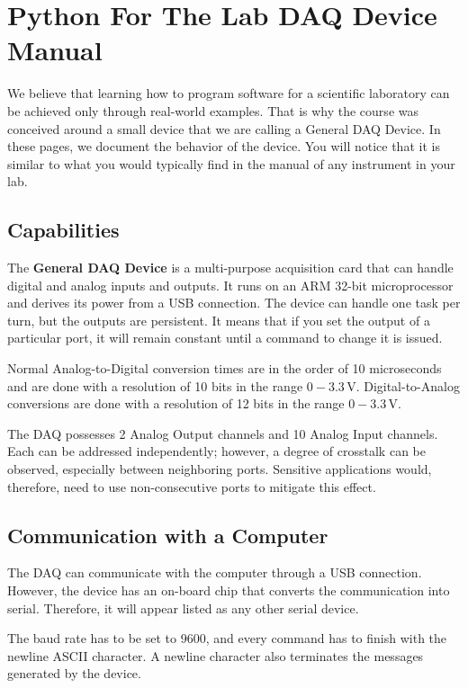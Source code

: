 \chapter[DAQ Device Manual]{Python For The Lab {DAQ} Device Manual}\label{ch:pftl-daq-manual}
We believe that learning how to program software for a scientific laboratory can be achieved only through real-world examples. That is why the course was conceived around a small device that we are calling a General {DAQ} Device. In these pages, we document the behavior of the device. You will notice that it is similar to what you would typically find in the manual of any instrument in your lab.

\section{Capabilities}\label{sec:capabilities}
The \textbf{General {DAQ} Device} is a multi-purpose acquisition card that can handle digital and analog inputs and outputs. It runs on an {ARM} 32-bit microprocessor and derives its power from a {USB} connection. The device can handle one task per turn, but the outputs are persistent. It means that if you set the output of a particular port, it will remain constant until a command to change it is issued.

Normal Analog-to-Digital conversion times are in the order of 10 microseconds and are done with a resolution of 10 bits in the range $0-3.3\,\textrm{V}$. Digital-to-Analog conversions are done with a resolution of 12 bits in the range $0-3.3\,\textrm{V}$.

The {DAQ} possesses 2 Analog Output channels and 10 Analog Input channels. Each can be addressed independently; however, a degree of crosstalk can be observed, especially between neighboring ports. Sensitive applications would, therefore, need to use non-consecutive ports to mitigate this effect.

\section{Communication with a Computer}\label{sec:communication-with-acomputer}
The {DAQ} can communicate with the computer through a {USB} connection. However, the device has an on-board chip that converts the communication into serial. Therefore, it will appear listed as any other serial device.

The baud rate has to be set to 9600, and every command has to finish with the newline {ASCII} character. A newline character also terminates the messages generated by the device.

